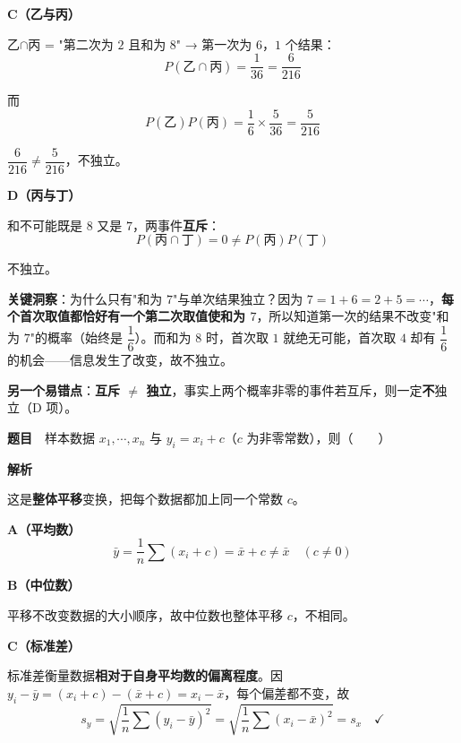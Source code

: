 \textbf{C（乙与丙）}

乙$\cap$丙 = "第二次为 $2$ 且和为 $8$" → 第一次为 $6$，$1$ 个结果：
\[P(\text{乙}\cap\text{丙})=\frac1{36}=\frac6{216}\]

而
\[P(\text{乙})P(\text{丙})=\frac16\times\frac5{36}=\frac5{216}\]

$\dfrac6{216}\ne\dfrac5{216}$，不独立。

\par\medskip

\textbf{D（丙与丁）}

和不可能既是 $8$ 又是 $7$，两事件\textbf{互斥}：
\[P(\text{丙}\cap\text{丁})=0\ne P(\text{丙})P(\text{丁})\]

不独立。


\begin{gktip}
\textbf{关键洞察}：为什么只有"和为 $7$"与单次结果独立？因为 $7=1+6=2+5=\cdots$，\textbf{每个首次取值都恰好有一个第二次取值使和为 $7$}，所以知道第一次的结果不改变"和为 $7$"的概率（始终是 $\dfrac16$）。而和为 $8$ 时，首次取 $1$ 就绝无可能，首次取 $4$ 却有 $\dfrac16$ 的机会——信息发生了改变，故不独立。

\textbf{另一个易错点}：\textbf{互斥 $\neq$ 独立}，事实上两个概率非零的事件若互斥，则一定\textbf{不}独立（D 项）。
\end{gktip}

\par\medskip



\textbf{题目}　样本数据 $x_1,\cdots,x_n$ 与 $y_i=x_i+c$（$c$ 为非零常数），则（　　）

\textbf{解析}

这是\textbf{整体平移}变换，把每个数据都加上同一个常数 $c$。

\textbf{A（平均数）}
\[\bar y=\frac1n\sum\left(x_i+c\right)=\bar x+c\ne\bar x\quad(c\ne0)\]

\textbf{B（中位数）}

平移不改变数据的大小顺序，故中位数也整体平移 $c$，不相同。

\textbf{C（标准差）}

标准差衡量数据\textbf{相对于自身平均数的偏离程度}。因 $y_i-\bar y=\left(x_i+c\right)-\left(\bar x+c\right)=x_i-\bar x$，每个偏差都不变，故
\[s_y=\sqrt{\frac1n\sum\left(y_i-\bar y\right)^{2}}=\sqrt{\frac1n\sum\left(x_i-\bar x\right)^{2}}=s_x\quad\checkmark\]

